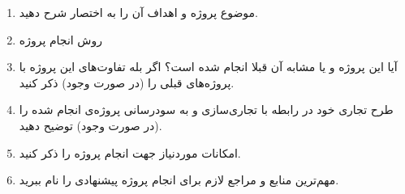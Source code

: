 \documentclass{article}
\begin{document}
\begin{center}
\vspace{3mm}

\end{center}

\newpage
\begin{enumerate}
\item 
موضوع پروژه و اهداف آن را به اختصار شرح دهید.


\item 
روش انجام پروژه


\item 
آیا این پروژه و یا مشابه آن قبلا انجام شده است؟ اگر بله تفاوت‌های این پروژه با پروژه‌های قبلی را (در صورت وجود) ذکر کنید.


\item 
طرح تجاری خود در رابطه با تجاری‌سازی و به سودرسانی پروژه‌ی انجام شده را (در صورت وجود) توضیح دهید.


\item 
امکانات موردنیاز جهت انجام پروژه را ذکر کنید.


\item 
مهم‌ترین منابع و مراجع لازم برای انجام پروژه پیشنهادی را نام ببرید.


\end{enumerate}
\end{document}

